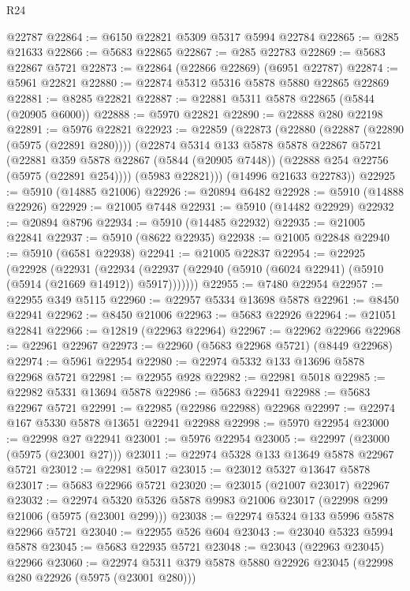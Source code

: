 \begin{lexlean}{R24}
\begin{coremodule}
    @22787
@22864 := @6150 @22821 @5309 @5317 @5994 @22784
@22865 := @285 @21633
@22866 := @5683 @22865
@22867 := @285 @22783
@22869 := @5683 @22867 @5721
@22873 := @22864 (@22866 @22869) (@6951 @22787)
@22874 := @5961 @22821
@22880 := @22874 @5312 @5316 @5878 @5880 @22865 @22869
@22881 := @8285 @22821
@22887 := @22881 @5311 @5878 @22865 (@5844 (@20905 @6000))
@22888 := @5970 @22821
@22890 := @22888 @280 @22198
@22891 := @5976 @22821
@22923 := @22859
    (@22873
      (@22880
        (@22887 (@22890 (@5975 (@22891 @280))))
        (@22874
          @5314
          @133
          @5878
          @5878
          @22867
          @5721
          (@22881
            @359
            @5878
            @22867
            (@5844 (@20905 @7448))
            (@22888 @254 @22756 (@5975 (@22891 @254))))
          (@5983 @22821)))
      (@14996 @21633 @22783))
@22925 := @5910 (@14885 @21006)
@22926 := @20894 @6482
@22928 := @5910 (@14888 @22926)
@22929 := @21005 @7448
@22931 := @5910 (@14482 @22929)
@22932 := @20894 @8796
@22934 := @5910 (@14485 @22932)
@22935 := @21005 @22841
@22937 := @5910 (@8622 @22935)
@22938 := @21005 @22848
@22940 := @5910 (@6581 @22938)
@22941 := @21005 @22837
@22954 := @22925
    (@22928
      (@22931
        (@22934 (@22937 (@22940 (@5910 (@6024 @22941) (@5910 (@5914 (@21669 @14912)) @5917)))))))
@22955 := @7480 @22954
@22957 := @22955 @349 @5115
@22960 := @22957 @5334 @13698 @5878
@22961 := @8450 @22941
@22962 := @8450 @21006
@22963 := @5683 @22926
@22964 := @21051 @22841
@22966 := @12819 (@22963 @22964)
@22967 := @22962 @22966
@22968 := @22961 @22967
@22973 := @22960 (@5683 @22968 @5721) (@8449 @22968)
@22974 := @5961 @22954
@22980 := @22974 @5332 @133 @13696 @5878 @22968 @5721
@22981 := @22955 @928
@22982 := @22981 @5018
@22985 := @22982 @5331 @13694 @5878
@22986 := @5683 @22941
@22988 := @5683 @22967 @5721
@22991 := @22985 (@22986 @22988) @22968
@22997 := @22974 @167 @5330 @5878 @13651 @22941 @22988
@22998 := @5970 @22954
@23000 := @22998 @27 @22941
@23001 := @5976 @22954
@23005 := @22997 (@23000 (@5975 (@23001 @27)))
@23011 := @22974 @5328 @133 @13649 @5878 @22967 @5721
@23012 := @22981 @5017
@23015 := @23012 @5327 @13647 @5878
@23017 := @5683 @22966 @5721
@23020 := @23015 (@21007 @23017) @22967
@23032 := @22974 @5320 @5326 @5878 @9983 @21006 @23017 (@22998 @299 @21006 (@5975 (@23001 @299)))
@23038 := @22974 @5324 @133 @5996 @5878 @22966 @5721
@23040 := @22955 @526 @604
@23043 := @23040 @5323 @5994 @5878
@23045 := @5683 @22935 @5721
@23048 := @23043 (@22963 @23045) @22966
@23060 := @22974 @5311 @379 @5878 @5880 @22926 @23045 (@22998 @280 @22926 (@5975 (@23001 @280)))

\end{coremodule}
\end{lexlean}
